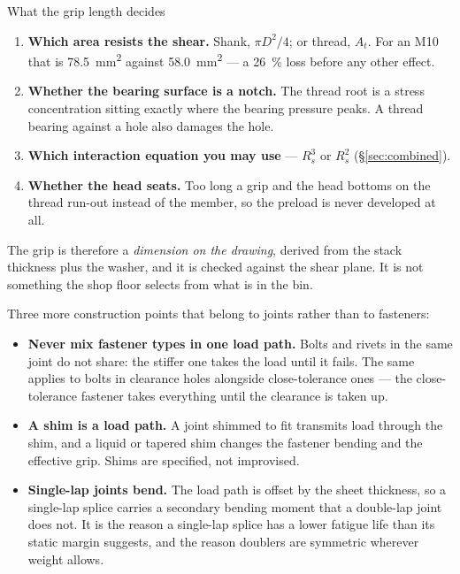\documentclass[11pt,a4paper]{article}
\begin{document}
\begin{keybox}{What the grip length decides}
\begin{enumerate}[leftmargin=*,itemsep=2pt]
\item \textbf{Which area resists the shear.} Shank, $\pi D^2/4$; or thread, $A_t$. For an M10 that
  is \SI{78.5}{mm^2} against \SI{58.0}{mm^2} --- a \SI{26}{\percent} loss before any other effect.
\item \textbf{Whether the bearing surface is a notch.} The thread root is a stress concentration
  sitting exactly where the bearing pressure peaks. A thread bearing against a hole also damages
  the hole.
\item \textbf{Which interaction equation you may use} --- $R_s^3$ or $R_s^2$ (\S\ref{sec:combined}).
\item \textbf{Whether the head seats.} Too long a grip and the head bottoms on the thread run-out
  instead of the member, so the preload is never developed at all.
\end{enumerate}

\medskip
The grip is therefore a \emph{dimension on the drawing}, derived from the stack thickness plus the
washer, and it is checked against the shear plane. It is not something the shop floor selects from
what is in the bin.
\end{keybox}

\medskip
Three more construction points that belong to joints rather than to fasteners:

\begin{itemize}[leftmargin=*,itemsep=3pt]
\item \textbf{Never mix fastener types in one load path.} Bolts and rivets in the same joint do not
  share: the stiffer one takes the load until it fails. The same applies to bolts in clearance holes
  alongside close-tolerance ones --- the close-tolerance fastener takes everything until the
  clearance is taken up.
\item \textbf{A shim is a load path.} A joint shimmed to fit transmits load through the shim, and
  a liquid or tapered shim changes the fastener bending and the effective grip. Shims are specified,
  not improvised.
\item \textbf{Single-lap joints bend.} The load path is offset by the sheet thickness, so a
  single-lap splice carries a secondary bending moment that a double-lap joint does not. It is the
  reason a single-lap splice has a lower fatigue life than its static margin suggests, and the
  reason doublers are symmetric wherever weight allows.
\end{itemize}
\end{document}
